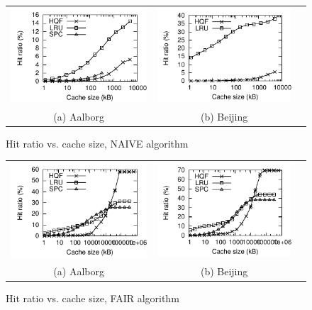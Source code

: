 \begin{figure}[htb]
\center
  \begin{tabular}{ccc}
     \includegraphics[width=0.5\columnwidth]{figures/cachesize_hitratio_rangenaive_aal.pdf}
     &
     \includegraphics[width=0.5\columnwidth]{figures/cachesize_hitratio_rangenaive_bei.pdf}
      \\
     (a) Aalborg & (b)  Beijing
     \end{tabular}
\caption{Hit ratio vs. cache size, NAIVE algorithm}
\label{fig:cachesizeVsHitRatioRangeNaive}
\end{figure}

\begin{figure}[htb]
\center
  \begin{tabular}{ccc}
     \includegraphics[width=0.5\columnwidth]{figures/cachesize_hitratio_rangefair_aal.pdf}
     &
     \includegraphics[width=0.5\columnwidth]{figures/cachesize_hitratio_rangefair_bei.pdf}
      \\
     (a) Aalborg & (b)  Beijing
     \end{tabular}
\caption{Hit ratio vs. cache size, FAIR algorithm}
\label{fig:cachesizeVsHitRatioRangeFair}
\end{figure}


